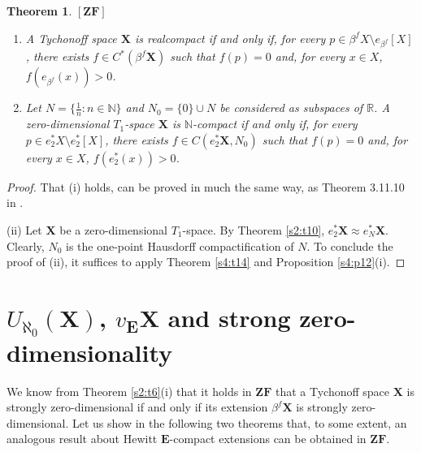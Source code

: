 \documentclass[12pt,twoside,leqno]{article}
\theoremstyle{plain}
\newtheorem{theorem}{Theorem}[section]
\theoremstyle{definition}
\theoremstyle{remark}
\begin{document}
\begin{theorem}
	\label{s4:t16}
	$[\mathbf{ZF}]$ 
	\begin{enumerate}
		\item[(i)]  A Tychonoff space $\mathbf{X}$ is realcompact if and only if, for every $p\in \beta^{f}X\setminus e_{\beta^f}[X]$, there exists $f\in C^{\ast}(\beta^f\mathbf{X})$ such that $f(p)=0$ and, for every $x\in X$, $f(e_{\beta^f}(x))>0$.
		\item[(ii)] Let $N=\{\frac{1}{n}: n\in\mathbb{N}\}$ and $N_0=\{0\}\cup N$ be considered as subspaces of $\mathbb{R}$. A zero-dimensional $T_1$-space $\mathbf{X}$ is $\mathbb{N}$-compact if and only if, for every $p\in e^{\ast}_{2}X\setminus e^{\ast}_{2}[X]$, there exists $f\in C(e^{\ast}_{2}\mathbf{X}, N_0)$ such that $f(p)=0$ and, for every $x\in X$, $f(e^{\ast}_{2}(x))>0$.
	\end{enumerate}
\end{theorem}
\begin{proof}
	That (i) holds, can be proved in much the same way, as Theorem 3.11.10 in \cite{en}.
	
	(ii) Let $\mathbf{X}$ be a zero-dimensional $T_1$-space. By Theorem \ref{s2:t10}, $e^{\ast}_{2}\mathbf{X}\approx e^{\ast}_{N}\mathbf{X}$. Clearly, $N_0$ is the one-point Hausdorff compactification of $N$. To conclude the proof of (ii), it suffices to apply Theorem \ref{s4:t14} and Proposition \ref{s4:p12}(i).
\end{proof}



\section{ $U_{\aleph_0}(\mathbf{X})$, $v_{\mathbf{E}}\mathbf{X}$ and strong zero-dimensionality}
\label{s5}

We know from Theorem \ref{s2:t6}(i) that it holds in $\mathbf{ZF}$ that a Tychonoff space $\mathbf{X}$ is strongly zero-dimensional if and only if its extension $\beta^{f}\mathbf{X}$ is strongly zero-dimensional. Let us show in the following two theorems that, to some extent, an analogous result about Hewitt $\mathbf{E}$-compact extensions can be obtained in $\mathbf{ZF}$. 
\end{document}
